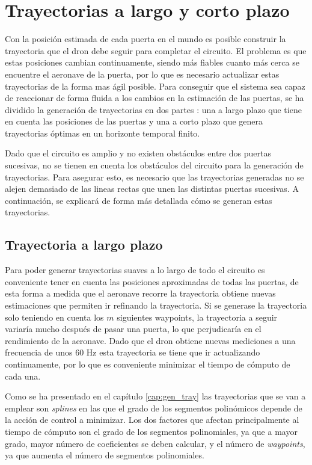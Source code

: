 \section{Trayectorias a largo y corto plazo}

Con la posición estimada de cada puerta en el mundo es posible construir la trayectoria que el dron debe seguir para completar el circuito. El problema es que estas posiciones cambian continuamente, siendo más fiables cuanto más cerca se encuentre el aeronave de la puerta, por lo que es necesario actualizar estas trayectorias de la forma mas ágil posible. Para conseguir que el sistema sea capaz de reaccionar de forma fluida a los cambios en la estimación de las puertas, se ha dividido la generación de trayectorias en dos partes : una a largo plazo que tiene en cuenta las posiciones de las puertas y una a corto plazo que genera trayectorias óptimas en un horizonte temporal finito.

Dado que el circuito es amplio y no existen obstáculos entre dos puertas sucesivas, no se tienen en cuenta los obstáculos del circuito para la generación de trayectorias. Para asegurar esto, es necesario que las trayectorias generadas no se alejen demasiado de las lineas rectas que unen las distintas puertas sucesivas. A continuación, se explicará de forma más detallada cómo se generan estas trayectorias.
\subsection{Trayectoria a largo plazo}

Para poder generar trayectorias suaves a lo largo de todo el circuito es conveniente tener en cuenta las posiciones aproximadas de todas las puertas,  de esta forma a medida que el aeronave recorre la trayectoria obtiene nuevas estimaciones que permiten ir refinando la trayectoria. Si se generase la trayectoria solo teniendo en cuenta los $m$ siguientes waypoints, la trayectoria a seguir variaría mucho después de pasar una puerta, lo que perjudicaría en el rendimiento de la aeronave. Dado que el dron obtiene nuevas mediciones a una frecuencia de unos 60 Hz esta trayectoria se tiene que ir actualizando continuamente, por lo que es conveniente minimizar el tiempo de cómputo de cada una. 

Como se ha presentado en el capítulo \ref{cap:gen_tray} las trayectorias que se van a emplear son \textit{splines} en las que el grado de los segmentos polinómicos depende de la acción de control a minimizar. Los dos factores que afectan principalmente al tiempo de cómputo son el grado de los segmentos polinomiales, ya que a mayor grado, mayor número de coeficientes se deben calcular, y el número de \textit{waypoints}, ya que aumenta el número de segmentos polinomiales.


